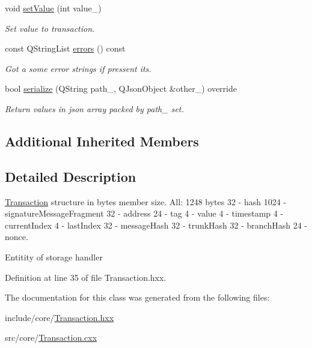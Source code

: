 \begin{DoxyCompactItemize}
void \mbox{\hyperlink{classeven_1_1_transaction_a50b19d32d3f4348598175df6ecbef771}{set\+Value}} (int value\+\_\+)
\begin{DoxyCompactList}\small\item\em Set value to transaction. \end{DoxyCompactList}\item 
\mbox{\label{classeven_1_1_transaction_ad2b1579b9a031a4774a331c370ce2862}} 
const Q\+String\+List \mbox{\hyperlink{classeven_1_1_transaction_ad2b1579b9a031a4774a331c370ce2862}{errors}} () const
\begin{DoxyCompactList}\small\item\em Got a some error strings if pressent its. \end{DoxyCompactList}\item 
\mbox{\label{classeven_1_1_transaction_a5b491ee3b550f20da6f7751fea75f3ec}} 
bool \mbox{\hyperlink{classeven_1_1_transaction_a5b491ee3b550f20da6f7751fea75f3ec}{serialize}} (Q\+String path\+\_\+, Q\+Json\+Object \&other\+\_\+) override
\begin{DoxyCompactList}\small\item\em Return values in json array packed by path\+\_\+ set. \end{DoxyCompactList}\end{DoxyCompactItemize}
\subsection*{Additional Inherited Members}


\subsection{Detailed Description}
\mbox{\hyperlink{classeven_1_1_transaction}{Transaction}} structure in bytes member size. All\+: 1248 bytes 32 -\/ hash 1024 -\/ signature\+Message\+Fragment 32 -\/ address 24 -\/ tag 4 -\/ value 4 -\/ timestamp 4 -\/ current\+Index 4 -\/ last\+Index 32 -\/ message\+Hash 32 -\/ trunk\+Hash 32 -\/ branch\+Hash 24 -\/ nonce. 

Entitity of storage handler 

Definition at line 35 of file Transaction.\+hxx.



The documentation for this class was generated from the following files\+:\begin{DoxyCompactItemize}
\item 
include/core/\mbox{\hyperlink{_transaction_8hxx}{Transaction.\+hxx}}\item 
src/core/\mbox{\hyperlink{_transaction_8cxx}{Transaction.\+cxx}}\end{DoxyCompactItemize}
